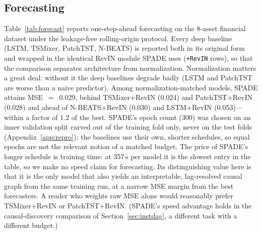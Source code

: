 \subsection{Forecasting}
\label{sec:forecast}

Table~\ref{tab:forecast} reports one-step-ahead forecasting on the 8-asset
financial dataset under the leakage-free rolling-origin protocol. Every deep
baseline (LSTM, TSMixer, PatchTST, N-BEATS) is reported both in its original
form and wrapped in the identical RevIN module SPADE uses (\texttt{+RevIN}
rows), so that the comparison separates architecture from normalization.
Normalization matters a great deal: without it the deep baselines degrade
badly (LSTM and PatchTST are worse than a naive predictor). Among
normalization-matched models, SPADE attains MSE~$=$~0.029, behind
TSMixer$+$RevIN (0.024) and PatchTST$+$RevIN (0.028) and ahead of
N-BEATS$+$RevIN (0.030) and LSTM$+$RevIN (0.053)---within a factor of
$1.2$ of the best. SPADE's epoch count (300) was chosen on an inner validation
split carved out of the training fold only, never on the test folds
(Appendix~\ref{app:repro}); the baselines use their own, shorter schedules, so
equal epochs are not the relevant notion of a matched budget. The price of
SPADE's longer schedule is training time: at 357\,s per model it is the
slowest entry in the table, so we make no speed claim for forecasting. Its
distinguishing value here is that it is the only model that also yields an
interpretable, lag-resolved causal graph from the same training run, at a
narrow MSE margin from the best forecasters. A reader who weights raw MSE alone
would reasonably prefer TSMixer$+$RevIN or PatchTST$+$RevIN. (SPADE's speed
advantage holds in the causal-discovery comparison of
Section~\ref{sec:instdag}, a different task with a different budget.)

\begin{table}[t]
\centering
\caption{Forecasting on the financial dataset ($N{=}1{,}827$, $d{=}8$),
leakage-free rolling-origin, mean$\pm$std over folds and seeds, plus mean
training wall-clock. \texttt{+RevIN} rows wrap the same baseline in SPADE's
own RevIN module (normalization-matched); unmarked baseline rows use no
normalization. MSE/MAE: lower is better. SPADE beats two of the four
\texttt{+RevIN} baselines on MSE and trails the other two by a narrow margin,
at a higher training cost than any of them.}
\label{tab:forecast}
\end{table}

